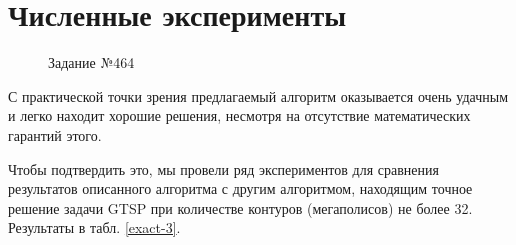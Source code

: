 \documentclass{article}
\begin{document}
\section{Численные эксперименты}
\begin{figure}
    \begin{center}
    \caption{Задание №464}
    \label{quality}
    \end{center}
\end{figure}

С практической точки зрения предлагаемый алгоритм
оказывается очень удачным
и легко находит хорошие решения,
несмотря на отсутствие математических гарантий этого.

Чтобы подтвердить это,
мы провели ряд экспериментов
для сравнения результатов описанного алгоритма
с другим алгоритмом,
находящим точное решение задачи GTSP
при количестве контуров
(мегаполисов) не более 32.
Результаты в табл. \ref{exact-3}.
\end{document}
